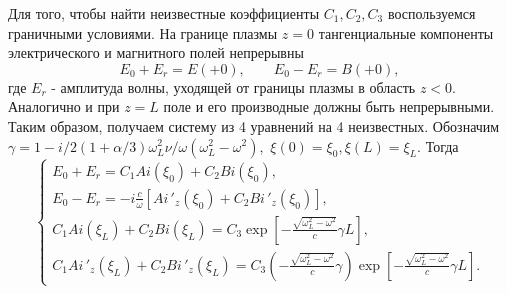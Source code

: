\documentclass[12pt,a4paper]{article}
\numberwithin{equation}{section}
\begin{document}
Для того, чтобы найти неизвестные коэффициенты $C_1, C_2, C_3$ воспользуемся граничными условиями. На границе плазмы $z=0$ тангенциальные компоненты электрического и магнитного полей непрерывны 
\begin{equation}
\label{bound}
    E_0+E_r=E(+0), \qquad  E_0-E_r=B(+0),
\end{equation}
где $E_r$ - амплитуда волны, уходящей от границы плазмы в область $z<0$. Аналогично и при $z=L$ поле и его производные должны быть непрерывными. Таким образом, получаем систему из 4 уравнений на 4 неизвестных. Обозначим $\gamma = 1-i/2\left(1+\alpha/3\right)\omega_L^2\nu/\omega\left(\omega_L^2-\omega^2\right),$ $\xi\left(0\right) = \xi_0, \xi\left(L\right) = \xi_L$. Тогда
\begin{equation}
    \label{system}
    \begin{cases}
    E_0+E_r = C_1 Ai\left(\xi_0\right)+C_2 Bi\left(\xi_0\right), \\
    E_0-E_r=-i\frac{c}{\omega}\left[Ai\,'_z\left(\xi_0\right)+C_2 Bi\,'_z\left(\xi_0\right)\right],\\
    C_1 Ai\left(\xi_L\right)+C_2 Bi\left(\xi_L\right)=C_3\exp\left[-\frac{\sqrt{\omega_L^2-\omega^2}}{c}\gamma L\right], \\
    C_1 Ai\,'_z\left(\xi_L\right)+C_2 Bi\,'_z\left(\xi_L\right)=  C_3\left(-\frac{\sqrt{\omega_L^2-\omega^2}}{c}\gamma \right)\exp\left[-\frac{\sqrt{\omega_L^2-\omega^2}}{c}\gamma L\right].
    
    \end{cases}
\end{equation}
\end{document}
